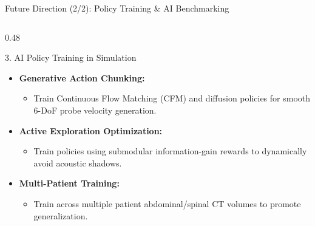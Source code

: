 \documentclass[aspectratio=169, 10pt]{beamer}
\begin{document}
\begin{frame}{Future Direction (2/2): Policy Training \& AI Benchmarking}
    \begin{columns}[T]
        \begin{column}{0.48\textwidth}
            \begin{block}{3. AI Policy Training in Simulation}
                \begin{itemize}\itemsep=3pt
                    \item \textbf{Generative Action Chunking:}
                    \begin{itemize}\itemsep=1pt
                        \item Train Continuous Flow Matching (CFM) and diffusion policies for smooth 6-DoF probe velocity generation.
                    \end{itemize}
                    \item \textbf{Active Exploration Optimization:}
                    \begin{itemize}\itemsep=1pt
                        \item Train policies using submodular information-gain rewards to dynamically avoid acoustic shadows.
                    \end{itemize}
                    \item \textbf{Multi-Patient Training:}
                    \begin{itemize}\itemsep=1pt
                        \item Train across multiple patient abdominal/spinal CT volumes to promote generalization.
                    \end{itemize}
                \end{itemize}
            \end{block}
        \end{column}


\end{columns}
\end{frame}
\end{document}
